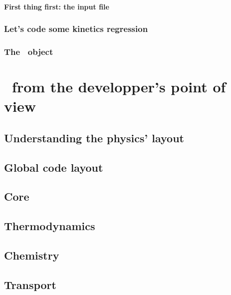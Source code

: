 \documentclass[twoside]{report}
\begin{document}
\subsection{First thing first: the input file}


\section{Let's code some kinetics regression}


\section{The \Units\ object}



\part{\Antioch\ from the developper's point of view}
\chapter{Understanding the physics' layout}


\chapter{Global code layout}


\chapter{Core}

\chapter{Thermodynamics}

\chapter{Chemistry}


\chapter{Transport}

\end{document}
